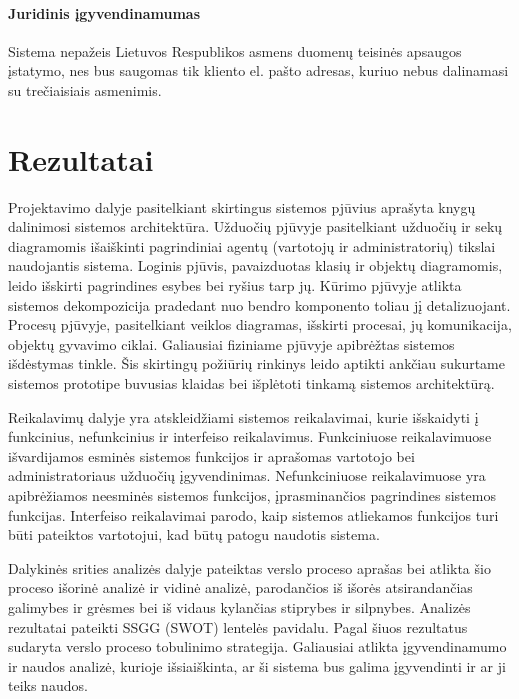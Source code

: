 \documentclass[12pt]{article}
\begin{document}
	\pagebreak
	\subsection{Juridinis įgyvendinamumas}
	Sistema nepažeis Lietuvos Respublikos asmens duomenų teisinės apsaugos įstatymo, nes bus saugomas tik kliento el. pašto adresas, kuriuo nebus dalinamasi su trečiaisiais asmenimis.
	\pagebreak
	
	\part*{Rezultatai}	
	Projektavimo dalyje pasitelkiant skirtingus sistemos pjūvius aprašyta knygų dalinimosi sistemos architektūra. Užduočių pjūvyje pasitelkiant užduočių ir sekų diagramomis išaiškinti pagrindiniai agentų (vartotojų ir administratorių) tikslai naudojantis sistema. Loginis pjūvis, pavaizduotas klasių ir objektų diagramomis, leido išskirti pagrindines esybes bei ryšius tarp jų. Kūrimo pjūvyje atlikta sistemos dekompozicija pradedant nuo bendro komponento toliau jį detalizuojant. Procesų pjūvyje, pasitelkiant veiklos diagramas, išskirti procesai, jų komunikacija, objektų gyvavimo ciklai. Galiausiai fiziniame pjūvyje apibrėžtas sistemos išdėstymas tinkle. Šis skirtingų požiūrių rinkinys leido aptikti ankčiau sukurtame sistemos prototipe buvusias klaidas bei išplėtoti tinkamą sistemos architektūrą.
	
	Reikalavimų dalyje yra atskleidžiami sistemos reikalavimai, kurie išskaidyti į funkcinius, nefunkcinius ir interfeiso reikalavimus. Funkciniuose reikalavimuose išvardijamos esminės sistemos funkcijos ir aprašomas vartotojo bei administratoriaus užduočių įgyvendinimas. Nefunkciniuose reikalavimuose yra apibrėžiamos neesminės sistemos funkcijos, įprasminančios pagrindines sistemos funkcijas. Interfeiso reikalavimai parodo, kaip sistemos atliekamos funkcijos turi būti pateiktos vartotojui, kad būtų patogu naudotis sistema.
	
	Dalykinės srities analizės dalyje pateiktas verslo proceso aprašas bei atlikta šio proceso išorinė analizė ir vidinė analizė, parodančios iš išorės atsirandančias galimybes ir grėsmes bei iš vidaus kylančias stiprybes ir silpnybes. Analizės rezultatai pateikti SSGG (SWOT) lentelės pavidalu. Pagal šiuos rezultatus sudaryta verslo proceso tobulinimo strategija. Galiausiai atlikta įgyvendinamumo ir naudos analizė, kurioje išsiaiškinta, ar ši sistema bus galima įgyvendinti ir ar ji teiks naudos.
	\pagebreak
	
\end{document}
